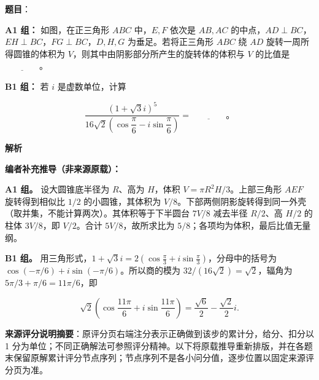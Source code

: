 \begin{answer}

\textbf{题目}：

\textbf{A1 组：} 如图，在正三角形 $ABC$ 中，$E,F$ 依次是 $AB,AC$ 的中点，$AD\perp BC$，$EH\perp BC$，$FG\perp BC$，$D,H,G$ 为垂足。若将正三角形 $ABC$ 绕 $AD$ 旋转一周所得圆锥的体积为 $V$，则其中由阴影部分所产生的旋转体的体积与 $V$ 的比值是 $\underline{\qquad\qquad}$。
\nopagebreak[4]
\begin{center}\end{center}
\nopagebreak[4]
\textbf{B1 组：} 若 $i$ 是虚数单位，计算

\nopagebreak[4]
\[
\dfrac{(1+\sqrt3i)^5}{16\sqrt2\left(\cos\dfrac{\pi}{6}-i\sin\dfrac{\pi}{6}\right)}=\underline{\qquad\qquad}\mbox{。}
\]

\textbf{解析}

\textbf{编者补充推导（非来源原载）：}

\textbf{A1 组。} 设大圆锥底半径为 $R$、高为 $H$，体积 $V=\pi R^2H/3$。上部三角形 $AEF$ 旋转得到相似比 $1/2$ 的小圆锥，其体积为 $V/8$。下部两侧阴影旋转得到同一外壳（取并集，不能计算两次）。其体积等于下半圆台 $7V/8$ 减去半径 $R/2$、高 $H/2$ 的柱体 $3V/8$，即 $V/2$。合计 $5V/8$，故所求比为 $5/8$；各项均为体积，最后比值无量纲。

\textbf{B1 组。} 用三角形式，$1+\sqrt3i=2(\cos\frac\pi3+i\sin\frac\pi3)$，分母中的括号为 $\cos(-\pi/6)+i\sin(-\pi/6)$。所以商的模为 $32/(16\sqrt2)=\sqrt2$，辐角为 $5\pi/3+\pi/6=11\pi/6$，即

\nopagebreak[4]
\[\sqrt2\left(\cos\frac{11\pi}{6}+i\sin\frac{11\pi}{6}\right)
=\frac{\sqrt6}{2}-\frac{\sqrt2}{2}i.\]


\end{answer}

\begin{gktip}
\textbf{来源评分说明摘要}：原评分页右端注分表示正确做到该步的累计分，给分、扣分以 1 分为单位；不同正确解法可参照评分精神。以下将原载推导重新排版，并在各题末保留原解累计评分节点序列；节点序列不是各小问分值，逐步位置以固定来源评分页为准。
\end{gktip}

